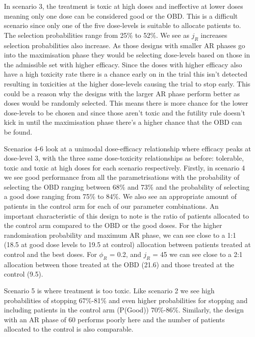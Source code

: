 In scenario 3, the treatment is toxic at high doses and ineffective at lower doses meaning only one dose can be considered good or the OBD. This is a difficult scenario since only one of the five dose-levels is suitable to allocate patients to. The selection probabilities range from 25\% to 52\%. We see as $j_R$ increases selection probabilities also increase. As those designs with smaller AR phases go into the maximisation phase they would be selecting dose-levels based on those in the admissible set with higher efficacy. Since the doses with higher efficacy also have a high toxicity rate there is a chance early on in the trial this isn't detected resulting in toxicities at the higher dose-levels causing the trial to stop early. This could be a reason why the designs with the larger AR phase perform better as doses would be randomly selected. This means there is more chance for the lower dose-levels to be chosen and since those aren't toxic and the futility rule doesn't kick in until the maximisation phase there's a higher chance that the OBD can be found.

Scenarios 4-6 look at a unimodal dose-efficacy relationship where efficacy peaks at dose-level 3, with the three same dose-toxicity relationships as before: tolerable, toxic and toxic at high doses for each scenario respectively. Firstly, in scenario 4 we see good performance from all the parametrisations with the probability of selecting the OBD ranging between 68\% and 73\% and the probability of selecting a good dose ranging from 75\% to 84\%. We also see an appropriate amount of patients in the control arm for each of our parameter combinations. An important characteristic of this design to note is the ratio of patients allocated to the control arm compared to the OBD or the good doses. For the higher randomisation probability and maximum AR phase, we can see close to a  1:1 (18.5 at good dose levels to 19.5 at control) allocation between patients treated at control and the best doses. For $\phi_R$ = 0.2, and $j_R$ = 45 we can see close to a 2:1 allocation between those treated at the OBD (21.6) and those treated at the control (9.5). 

Scenario 5 is where treatment is too toxic. Like scenario 2 we see high probabilities of stopping 67\%-81\% and even higher probabilities for stopping and including patients in the control arm (P(Good)) 70\%-86\%. Similarly, the design with an AR phase of 60 performs poorly here and the number of patients allocated to the control is also comparable. 

